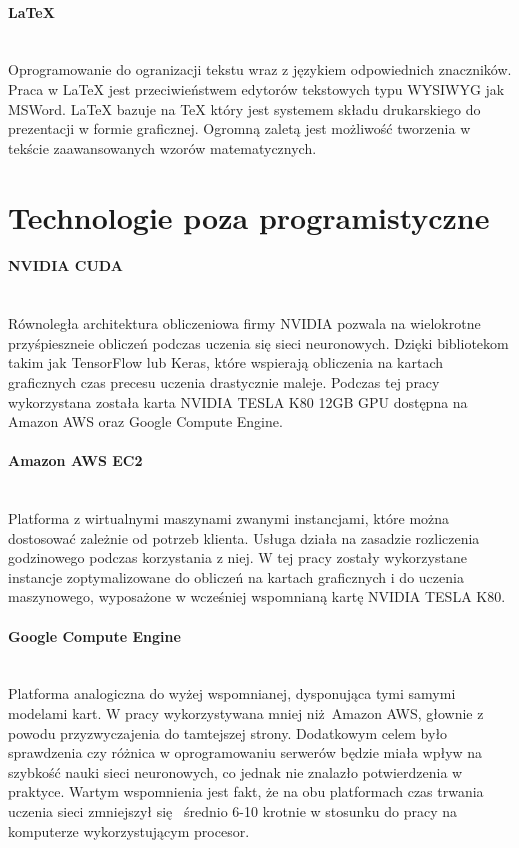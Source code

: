 \paragraph{LaTeX} \mbox{}\\
Oprogramowanie do ogranizacji tekstu wraz z językiem odpowiednich znaczników.
Praca w LaTeX jest przeciwieństwem edytorów tekstowych typu WYSIWYG jak MSWord.
LaTeX bazuje na TeX który jest systemem składu drukarskiego do prezentacji w
formie graficznej. Ogromną zaletą jest możliwość tworzenia w tekście zaawansowanych
wzorów matematycznych.

\section{Technologie poza programistyczne}

\paragraph{NVIDIA CUDA} \mbox{}\\
Równoległa architektura obliczeniowa firmy NVIDIA pozwala na wielokrotne
przyśpieszneie obliczeń podczas uczenia się sieci neuronowych. Dzięki bibliotekom
takim jak TensorFlow lub Keras, które wspierają obliczenia na kartach graficznych
czas precesu uczenia drastycznie maleje. Podczas tej pracy wykorzystana została
karta NVIDIA TESLA K80 12GB GPU dostępna na Amazon AWS oraz Google Compute Engine.

\paragraph{Amazon AWS EC2} \mbox{}\\
Platforma z wirtualnymi maszynami zwanymi instancjami, które można dostosować
zależnie od potrzeb klienta. Usługa działa na zasadzie rozliczenia godzinowego
podczas korzystania z niej. W tej pracy zostały wykorzystane instancje
zoptymalizowane do obliczeń na kartach graficznych i do uczenia maszynowego,
wyposażone w wcześniej wspomnianą kartę NVIDIA TESLA K80.

\paragraph{Google Compute Engine} \mbox{}\\
Platforma analogiczna do wyżej wspomnianej, dysponująca tymi samymi
modelami kart. W pracy wykorzystywana mniej niż Amazon AWS, głownie z powodu
przyzwyczajenia do tamtejszej strony. Dodatkowym celem było sprawdzenia czy
różnica w oprogramowaniu serwerów będzie miała wpływ na szybkość nauki sieci
neuronowych, co jednak nie znalazło potwierdzenia w praktyce. Wartym wspomnienia
jest fakt, że na obu platformach czas trwania uczenia sieci zmniejszył się 
średnio 6-10 krotnie w stosunku do pracy na komputerze wykorzystującym procesor.
